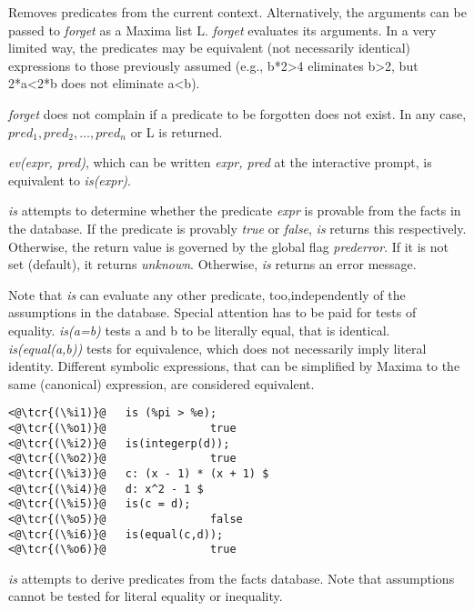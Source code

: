 \documentclass[../Maxima_Workbook.tex]{subfiles}
\begin{document}
\lzz \hypertarget{forget}{} \hfill \tcr{[function]}


\lz Removes predicates from the current context. Alternatively, the arguments can be passed to \emph{forget} as a Maxima list L. \emph{forget} evaluates its arguments. In a very limited way, the predicates may  be equivalent (not necessarily identical) expressions to those previously assumed (e.g., b*2>4 eliminates b>2, but 2*a<2*b does not eliminate a<b).

\lz \emph{forget} does not complain if a predicate to be forgotten does not exist. In any case, $ pred_1, pred_2, \dots, pred_n $ or L is returned.

\lzz \hypertarget{is}{} \hfill \tcr{[function]}

\lz \emph{ev(expr, pred)}, which can be written \emph{ expr, pred } at the interactive prompt, is equivalent to \emph{is(expr)}.

\lz \emph{is} attempts to determine whether the predicate \emph{expr} is provable from the facts in the database. If the predicate is provably \emph{true} or \emph{false}, \emph{is} returns this respectively. Otherwise, the return value is governed by the global flag \emph{prederror}. If it is not set (default), it returns \emph{unknown}. Otherwise, \emph{is} returns an error message. 

\lz Note that \emph{is} can evaluate any other predicate, too,independently of the assumptions in the database. Special attention has to be paid for tests of equality. \emph{is(a=b)} tests a and b to be literally equal, that is identical. \emph{is(equal(a,b))} tests for equivalence, which does not necessarily imply literal identity. Different symbolic expressions, that can be simplified by Maxima to the same (canonical) expression, are considered equivalent.

\lz \begin{lstlisting}
<@\tcr{(\%i1)}@   is (%pi > %e);
<@\tcr{(\%o1)}@			       true
<@\tcr{(\%i2)}@   is(integerp(d));
<@\tcr{(\%o2)}@			       true
<@\tcr{(\%i3)}@   c: (x - 1) * (x + 1) $
<@\tcr{(\%i4)}@   d: x^2 - 1 $
<@\tcr{(\%i5)}@   is(c = d);
<@\tcr{(\%o5)}@			       false
<@\tcr{(\%i6)}@   is(equal(c,d));
<@\tcr{(\%o6)}@			       true
\end{lstlisting}

\lz \emph{is} attempts to derive predicates from the facts database. Note that assumptions cannot be tested for literal equality or inequality.
\end{document}
